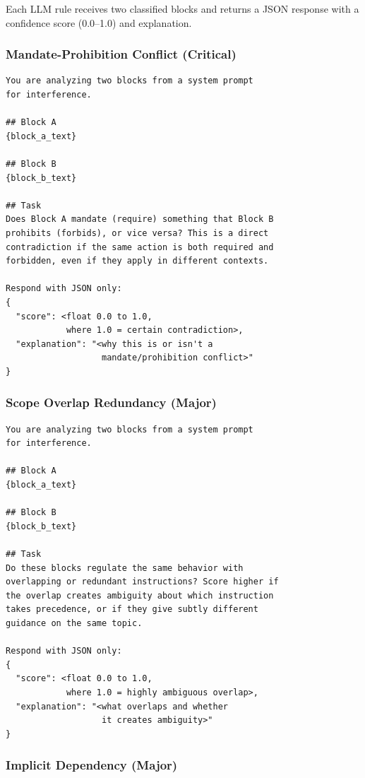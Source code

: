 Each LLM rule receives two classified blocks and returns a JSON response
with a confidence score (0.0--1.0) and explanation.

\subsubsection{Mandate-Prohibition Conflict (Critical)}

\begin{Verbatim}
You are analyzing two blocks from a system prompt
for interference.

## Block A
{block_a_text}

## Block B
{block_b_text}

## Task
Does Block A mandate (require) something that Block B
prohibits (forbids), or vice versa? This is a direct
contradiction if the same action is both required and
forbidden, even if they apply in different contexts.

Respond with JSON only:
{
  "score": <float 0.0 to 1.0,
            where 1.0 = certain contradiction>,
  "explanation": "<why this is or isn't a
                   mandate/prohibition conflict>"
}
\end{Verbatim}

\subsubsection{Scope Overlap Redundancy (Major)}

\begin{Verbatim}
You are analyzing two blocks from a system prompt
for interference.

## Block A
{block_a_text}

## Block B
{block_b_text}

## Task
Do these blocks regulate the same behavior with
overlapping or redundant instructions? Score higher if
the overlap creates ambiguity about which instruction
takes precedence, or if they give subtly different
guidance on the same topic.

Respond with JSON only:
{
  "score": <float 0.0 to 1.0,
            where 1.0 = highly ambiguous overlap>,
  "explanation": "<what overlaps and whether
                   it creates ambiguity>"
}
\end{Verbatim}

\subsubsection{Implicit Dependency (Major)}

